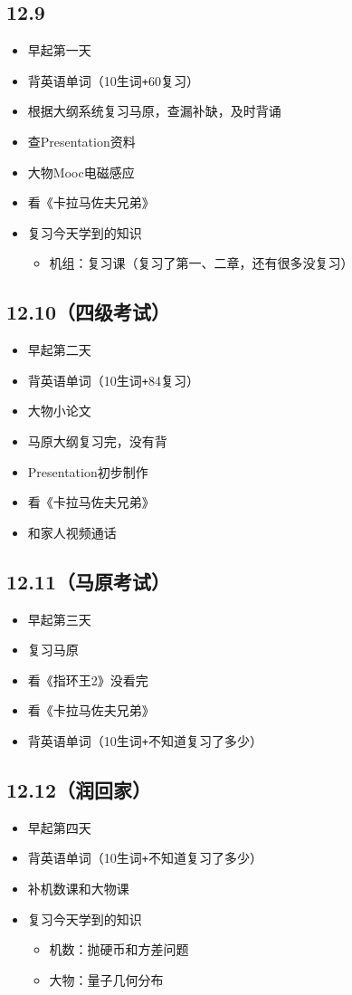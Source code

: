 \documentclass[UTF8]{ctexart}
\begin{document}
\subsection*{12.9}
\begin{itemize}
    \item 早起第一天
    \item 背英语单词（10生词\verb|+|60复习）
    \item 根据大纲系统复习马原，查漏补缺，及时背诵
    \item 查Presentation资料
    \item 大物Mooc电磁感应
    \item 看《卡拉马佐夫兄弟》
    \item 复习今天学到的知识
          \begin{itemize}
              \item 机组：复习课（复习了第一、二章，还有很多没复习）
          \end{itemize}
\end{itemize}
\subsection*{12.10（四级考试）}
\begin{itemize}
    \item 早起第二天
    \item 背英语单词（10生词\verb|+|84复习）
    \item 大物小论文
    \item 马原大纲复习完，没有背
    \item Presentation初步制作
    \item 看《卡拉马佐夫兄弟》
    \item 和家人视频通话
\end{itemize}
\subsection*{12.11（马原考试）}
\begin{itemize}
    \item 早起第三天
    \item 复习马原
    \item 看《指环王2》没看完
    \item 看《卡拉马佐夫兄弟》
    \item 背英语单词（10生词\verb|+|不知道复习了多少）
\end{itemize}
\subsection*{12.12（润回家）}
\begin{itemize}
    \item 早起第四天
    \item 背英语单词（10生词\verb|+|不知道复习了多少）
    \item 补机数课和大物课
    \item 复习今天学到的知识
          \begin{itemize}
              \item 机数：抛硬币和方差问题
              \item 大物：量子几何分布
          \end{itemize}
\end{itemize}
\end{document}
